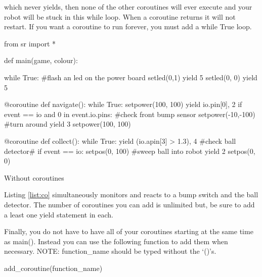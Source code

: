\documentclass[a4paper, 12pt]{article}
\begin{document}
which never yields, then none of the other coroutines will ever execute and your robot will be stuck in this while loop. When a coroutine returns it will not restart. If you want a coroutine to run forever, you must add a while True loop.

\begin{python}
\begin{verbatimtab}
from sr import *

def main(game, colour):
    
    while True:    #flash an led on the power board
        setled(0,1)
        yield 5
        setled(0, 0)
        yield 5

@coroutine
def navigate():
    while True:
        setpower(100, 100)
        yield io.pin[0], 2
        if event == io and 0 in event.io.pins:    #check front bump sensor
            setpower(-10,-100)    #turn around
            yield 3  
            setpower(100, 100)      
    
@coroutine
def collect():
    while True:
        yield (io.apin[3] > 1.3), 4    #check ball detector#
        if event == io:
            setpos(0, 100)    #sweep ball into robot
            yield 2
            setpos(0, 0)
\end{verbatimtab}
\caption{\label{list:co} Without coroutines}
\end{python}

Listing \ref{list:co} simultaneously monitors and reacts to a bump switch and the ball detector. The number of coroutines you can add is unlimited but, be sure to add a least one yield statement in each.

Finally, you do not have to have all of your coroutines starting at the same time as main(). Instead you can use the following function to add them when necessary. NOTE: function\_name should be typed without the `()'s.
\begin{verbatimtab}
add_coroutine(function_name)
\end{verbatimtab}
\end{document}
